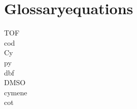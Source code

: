 
\chapter*{Glossaryequations}
\label{ch:glossaryequations}

\gls{TOF}\\
\gls{cod}\\
\gls{Cy}\\
\gls{py}\\
\gls{dbf}\\
\gls{DMSO}\\
\gls{cymene}\\
\gls{cot}\\